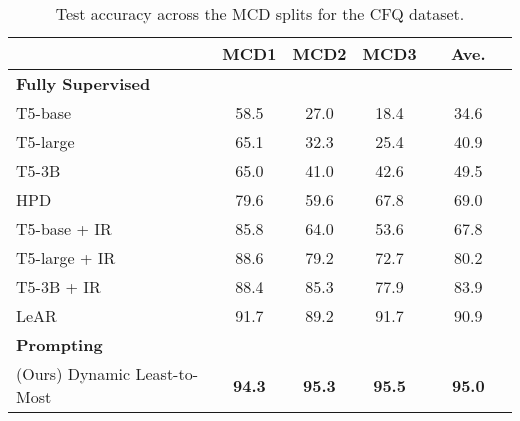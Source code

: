 \documentclass{article} \usepackage{iclr2022_conference,times}
\begin{document}
\begin{table}[t!]
\setlength\tabcolsep{4pt}
\begin{center}
\begin{tabular}{ l | c | c | c | c }
\toprule
 & MCD1 & MCD2 & MCD3 & ~~Ave.~~ \\
\midrule
{\small \bf Fully Supervised} & & & & \\
T5-base \citep{herzig2021unlocking} 
             & 58.5 & 27.0 & 18.4 & 34.6 \\
T5-large \citep{herzig2021unlocking} 
             & 65.1 & 32.3 & 25.4 & 40.9 \\
T5-3B \citep{herzig2021unlocking} 
             & 65.0 & 41.0 & 42.6 & 49.5 \\
HPD \citep{guo2020hierarchical}
             & 79.6 & 59.6 & 67.8 & 69.0 \\
T5-base + IR \citep{herzig2021unlocking} 
             & 85.8 & 64.0 & 53.6 & 67.8 \\
T5-large + IR \citep{herzig2021unlocking} 
             & 88.6 & 79.2 & 72.7 & 80.2 \\
T5-3B + IR \citep{herzig2021unlocking} 
             & 88.4 & 85.3 & 77.9 & 83.9 \\
LeAR \citep{liu-etal-2021-learning-algebraic}
             & 91.7 & 89.2 & 91.7 & 90.9 \\
\midrule
{\small \bf Prompting} & & & & \\
(Ours) Dynamic Least-to-Most
    & \textbf{94.3} & \textbf{95.3} & \textbf{95.5} & \textbf{95.0} \\
\bottomrule
\end{tabular}
\end{center}
\caption{Test accuracy across the MCD splits for the CFQ dataset.}
\label{tab:results_cfq}
\end{table}
\end{document}

